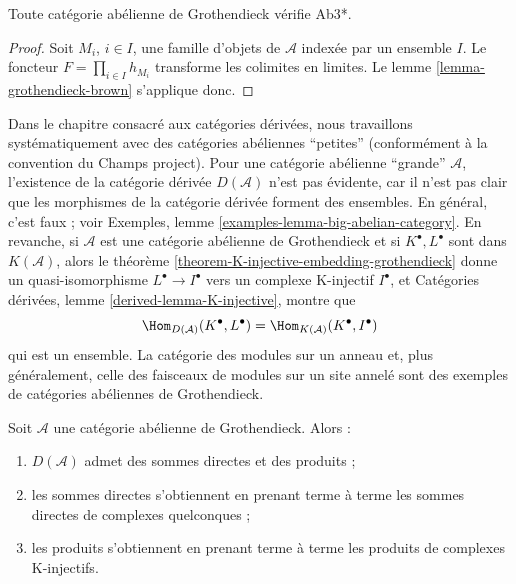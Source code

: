 \begin{lemma}
\label{lemma-grothendieck-products}
Toute catégorie abélienne de Grothendieck vérifie Ab3*.
\end{lemma}

\begin{proof}
Soit $M_i$, $i \in I$, une famille d'objets de $\mathcal{A}$ indexée par un
ensemble $I$. Le foncteur $F = \prod_{i \in I} h_{M_i}$ transforme les
colimites en limites. Le
lemme \ref{lemma-grothendieck-brown} s'applique donc.
\end{proof}

\begin{remark}
\label{remark-existence-D}
Dans le chapitre consacré aux catégories dérivées, nous travaillons
systématiquement avec des catégories abéliennes ``petites'' (conformément à
la convention du Champs project). Pour une catégorie abélienne ``grande''
$\mathcal{A}$, l'existence de la catégorie dérivée $D(\mathcal{A})$ n'est pas
évidente, car il n'est pas clair que les morphismes de la catégorie dérivée
forment des ensembles. En général, c'est faux ; voir
Exemples, lemme \ref{examples-lemma-big-abelian-category}.
En revanche, si $\mathcal{A}$ est une catégorie abélienne de Grothendieck et si
$K^\bullet, L^\bullet$ sont dans $K(\mathcal{A})$, alors le
théorème \ref{theorem-K-injective-embedding-grothendieck} donne un
quasi-isomorphisme $L^\bullet \to I^\bullet$ vers un complexe K-injectif
$I^\bullet$, et Catégories dérivées,
lemme \ref{derived-lemma-K-injective}, montre que
$$
\Hom_{D(\mathcal{A})}(K^\bullet, L^\bullet) =
\Hom_{K(\mathcal{A})}(K^\bullet, I^\bullet)
$$
qui est un ensemble. La catégorie des modules sur un anneau et, plus
généralement, celle des faisceaux de modules sur un site annelé sont des
exemples de catégories abéliennes de Grothendieck.
\end{remark}

\begin{lemma}
\label{lemma-derived-products}
Soit $\mathcal{A}$ une catégorie abélienne de Grothendieck. Alors :
\begin{enumerate}
\item $D(\mathcal{A})$ admet des sommes directes et des produits ;
\item les sommes directes s'obtiennent en prenant terme à terme les sommes
directes de complexes quelconques ;
\item les produits s'obtiennent en prenant terme à terme les produits de
complexes K-injectifs.
\end{enumerate}
\end{lemma}

